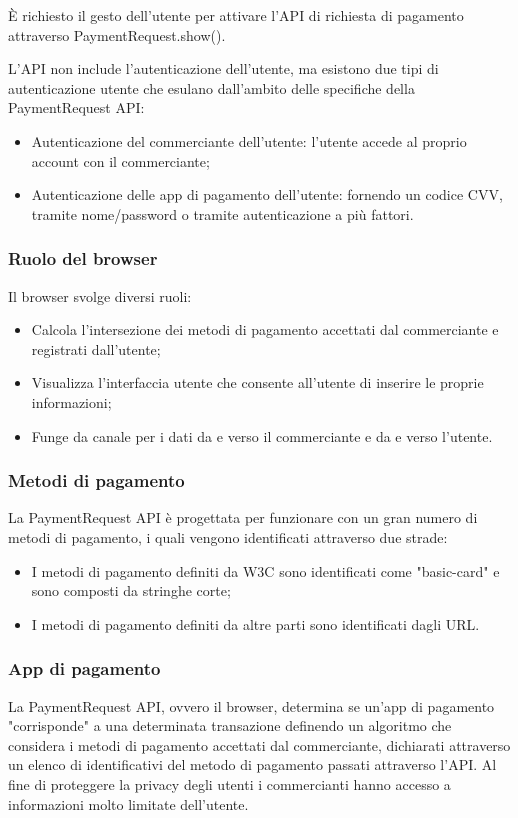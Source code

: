 \documentclass[italian]{article}
\begin{document}
	È richiesto il gesto dell'utente per attivare l'API di richiesta di pagamento attraverso PaymentRequest.show().
	
	L'API non include l'autenticazione dell'utente, ma esistono due tipi di autenticazione utente che esulano dall'ambito delle specifiche della PaymentRequest API:
	\begin{itemize}
	\item Autenticazione del commerciante dell'utente: l'utente accede al proprio account con il commerciante;
	\item Autenticazione delle app di pagamento dell'utente: fornendo un codice CVV, tramite nome/password o tramite autenticazione a più fattori.
	\end{itemize}
	
	\subsubsection{Ruolo del browser}
	Il browser svolge diversi ruoli:
	\begin{itemize}
	\item Calcola l'intersezione dei metodi di pagamento accettati dal commerciante e registrati dall'utente;
	\item Visualizza l'interfaccia utente che consente all'utente di inserire le proprie informazioni;
	\item Funge da canale per i dati da e verso il commerciante e da e verso l'utente.
	\end{itemize}
	
	\subsubsection{Metodi di pagamento}
	La PaymentRequest API è progettata per funzionare con un gran numero di metodi di pagamento, i quali vengono identificati attraverso due strade:
	\begin{itemize}
		\item I metodi di pagamento definiti da W3C sono identificati come "basic-card" e sono composti da stringhe corte;
		\item I metodi di pagamento definiti da altre parti sono identificati dagli URL.
	\end{itemize}
	
	\subsubsection{App di pagamento}
	La PaymentRequest API, ovvero il browser, determina se un'app di pagamento "corrisponde" a una determinata transazione definendo un algoritmo che considera i metodi di pagamento accettati dal commerciante, dichiarati attraverso un elenco di identificativi del metodo di pagamento passati attraverso l'API.
	Al fine di proteggere la privacy degli utenti i commercianti hanno accesso a informazioni molto limitate dell'utente. 
	
\end{document}
